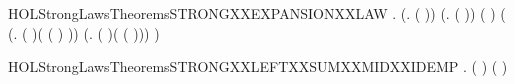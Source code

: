 \begin{SaveVerbatim}{HOLStrongLawsTheoremsSTRONGXXEXPANSIONXXLAW}
\HOLTokenTurnstile{} \HOLSymConst{\HOLTokenForall{}}   .
       (\HOLSymConst{\HOLTokenForall{}}.  \HOLSymConst{\HOLTokenLeq{}}  \HOLSymConst{\HOLTokenImp{}}  ( )) \HOLSymConst{\HOLTokenConj{}}
       (\HOLSymConst{\HOLTokenForall{}}.  \HOLSymConst{\HOLTokenLeq{}}  \HOLSymConst{\HOLTokenImp{}}  ( )) \HOLSymConst{\HOLTokenImp{}}
        (   \HOLSymConst{\ensuremath{\parallel}}   )
         (
            (\HOLTokenLambda{}.  ( )( ( ) \HOLSymConst{\ensuremath{\parallel}}   ))
             \HOLSymConst{\ensuremath{+}}
            (\HOLTokenLambda{}.  ( )(   \HOLSymConst{\ensuremath{\parallel}}  ( )))
             \HOLSymConst{\ensuremath{+}}     )
\end{SaveVerbatim}
\newcommand{\HOLStrongLawsTheoremsSTRONGXXEXPANSIONXXLAW}{\UseVerbatim{HOLStrongLawsTheoremsSTRONGXXEXPANSIONXXLAW}}
\begin{SaveVerbatim}{HOLStrongLawsTheoremsSTRONGXXLEFTXXSUMXXMIDXXIDEMP}
\HOLTokenTurnstile{} \HOLSymConst{\HOLTokenForall{}}  .  ( \HOLSymConst{\ensuremath{+}}  \HOLSymConst{\ensuremath{+}}  \HOLSymConst{\ensuremath{+}} ) ( \HOLSymConst{\ensuremath{+}}  \HOLSymConst{\ensuremath{+}} )
\end{SaveVerbatim}
\newcommand{\HOLStrongLawsTheoremsSTRONGXXLEFTXXSUMXXMIDXXIDEMP}{\UseVerbatim{HOLStrongLawsTheoremsSTRONGXXLEFTXXSUMXXMIDXXIDEMP}}
